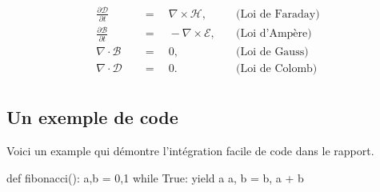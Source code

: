 \documentclass{udes_rapport} %
\begin{document}
\begin{equation}
    \begin{aligned}
        \frac{\partial\mathcal{D}}{\partial t} \quad & = \quad \nabla\times\mathcal{H},   & \quad \text{(Loi de Faraday)} \\[5pt]
        \frac{\partial\mathcal{B}}{\partial t} \quad & = \quad -\nabla\times\mathcal{E},  & \quad \text{(Loi d'Ampère)}   \\[5pt]
        \nabla\cdot\mathcal{B}                 \quad & = \quad 0,                         & \quad \text{(Loi de Gauss)}   \\[5pt]
        \nabla\cdot\mathcal{D}                 \quad & = \quad 0.                         & \quad \text{(Loi de Colomb)}  \\[5pt]
    \end{aligned}
\end{equation}

\subsection{Un exemple de code}

Voici un example qui démontre l'intégration facile de code dans le rapport.
\begin{pythoncode}
def fibonacci():
    a,b = 0,1
    while True:
        yield a
        a, b = b, a + b
\end{pythoncode}
\end{document}
